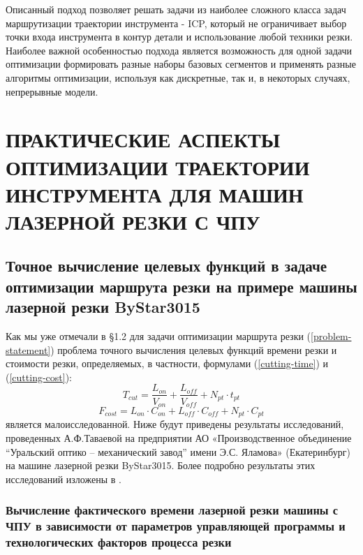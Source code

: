 \documentclass[12pt]{report}
\newcounter{lem}
\begin{document}
Описанный подход позволяет решать задачи из
наиболее сложного класса задач маршрутизации
траектории инструмента - ICP,
который не ограничивает выбор точки входа
инструмента в контур детали и использование
любой техники резки.
Наиболее важной особенностью подхода
является возможность для одной задачи оптимизации
формировать разные наборы базовых сегментов и
применять разные алгоритмы оптимизации,
используя как дискретные, так и,
в некоторых случаях, непрерывные модели.
















\chapter{ПРАКТИЧЕСКИЕ АСПЕКТЫ ОПТИМИЗАЦИИ ТРАЕКТОРИИ ИНСТРУМЕНТА ДЛЯ МАШИН ЛАЗЕРНОЙ РЕЗКИ С ЧПУ}
\setcounter{chapter}{2}
\setcounter{equation}{0}

\section{Точное вычисление целевых функций в задаче оптимизации маршрута резки на примере машины лазерной резки ByStar3015}

Как мы уже  отмечали в \S 1.2
для задачи оптимизации маршрута резки (\ref{problem-statement})
проблема точного вычисления целевых функций времени резки и стоимости резки,
определяемых, в частности, формулами (\ref{cutting-time}) и (\ref{cutting-cost}):
$$
T_{cut} = \frac{L_{on}}{V_{on}} + \frac{L_{off}}{V_{off}} +N_{pt} \cdot t_{pt}
$$
$$
F_{cost}=
L_{on} \cdot C_{on} +
L_{off} \cdot C_{off} +
N_{pt} \cdot C_{pt}
$$
является малоисследованной.
Ниже будут приведены результаты исследований,
проведенных А.Ф.Таваевой на предприятии
АО «Производственное объединение “Уральский оптико – механический завод”
имени Э.С. Яламова» (Екатеринбург)
на машине лазерной резки ByStar3015.
Более подробно результаты этих исследований изложены в
\cite{intro45,intro46,intro47}.

\subsection{Вычисление фактического времени лазерной резки машины с ЧПУ
в зависимости от параметров управляющей программы и технологических факторов процесса резки}
\end{document}
